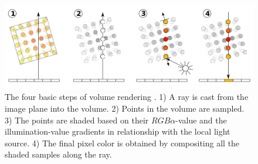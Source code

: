 \begin{figure}[h]
    \centering
    \includegraphics[width=1.0\textwidth]{figures/volume-rendering.png}
    \caption{The four basic steps of volume rendering \cite{wiki:Volume_ray_casting}. 1) A ray is cast from the image plane into the volume. 2) Points in the volume are sampled. 3) The points are shaded based on their $RGB\alpha$-value and the illumination-value gradients in relationship with the local light source. 4) The final pixel color is obtained by compositing all the shaded samples along the ray.}
    \label{fig:volume-rendering}
\end{figure}